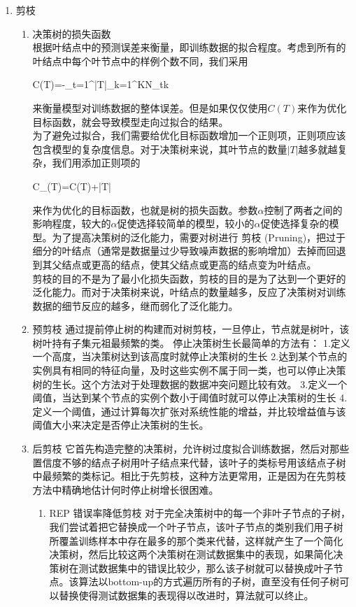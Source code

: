 \begin{enumerate}
\begin{itemize}
	\end{itemize}
	\item 剪枝
	\begin{enumerate}
		\item 决策树的损失函数\\
		根据叶结点中的预测误差来衡量，即训练数据的拟合程度。考虑到所有的叶结点中每个叶节点中的样例个数不同，我们采用
		\begin{flalign}
		C(T)=-\sum_{t=1}^{|T|}\sum_{k=1}^{K}N_{tk}\log{}
		\end{flalign}
		来衡量模型对训练数据的整体误差。但是如果仅仅使用$C(T)$来作为优化目标函数，就会导致模型走向过拟合的结果。\\
		为了避免过拟合，我们需要给优化目标函数增加一个正则项，正则项应该包含模型的复杂度信息。对于决策树来说，其叶节点的数量$|T|$越多就越复杂，我们用添加正则项的
		\begin{flalign}
			C_\alpha(T)=C(T)+\alpha|T|
		\end{flalign}
		来作为优化的目标函数，也就是树的损失函数。参数$\alpha$控制了两者之间的影响程度，较大的$\alpha$促使选择较简单的模型，较小的$\alpha$促使选择复杂的模型。为了提高决策树的泛化能力，需要对树进行 剪枝 (Pruning)，把过于细分的叶结点（通常是数据量过少导致噪声数据的影响增加）去掉而回退到其父结点或更高的结点，使其父结点或更高的结点变为叶结点。\\
		剪枝的目的不是为了最小化损失函数，剪枝的目的是为了达到一个更好的泛化能力。而对于决策树来说，叶结点的数量越多，反应了决策树对训练数据的细节反应的越多，继而弱化了泛化能力。
		\item 预剪枝
		通过提前停止树的构建而对树剪枝，一旦停止，节点就是树叶，该树叶持有子集元祖最频繁的类。	
		停止决策树生长最简单的方法有：
		1.定义一个高度，当决策树达到该高度时就停止决策树的生长
		2.达到某个节点的实例具有相同的特征向量，及时这些实例不属于同一类，也可以停止决策树的生长。这个方法对于处理数据的数据冲突问题比较有效。		
		3.定义一个阈值，当达到某个节点的实例个数小于阈值时就可以停止决策树的生长	
		4.定义一个阈值，通过计算每次扩张对系统性能的增益，并比较增益值与该阈值大小来决定是否停止决策树的生长。
		\item 后剪枝
		它首先构造完整的决策树，允许树过度拟合训练数据，然后对那些置信度不够的结点子树用叶子结点来代替，该叶子的类标号用该结点子树中最频繁的类标记。相比于先剪枝，这种方法更常用，正是因为在先剪枝方法中精确地估计何时停止树增长很困难。
		\begin{enumerate}
			\item REP 错误率降低剪枝
			对于完全决策树中的每一个非叶子节点的子树，我们尝试着把它替换成一个叶子节点，该叶子节点的类别我们用子树所覆盖训练样本中存在最多的那个类来代替，这样就产生了一个简化决策树，然后比较这两个决策树在测试数据集中的表现，如果简化决策树在测试数据集中的错误比较少，那么该子树就可以替换成叶子节点。该算法以bottom-up的方式遍历所有的子树，直至没有任何子树可以替换使得测试数据集的表现得以改进时，算法就可以终止。

\end{enumerate}
\end{enumerate}
\end{enumerate}
